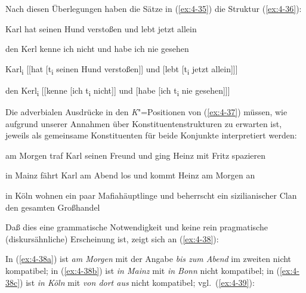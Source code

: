 \documentclass[output=paper]{langsci/langscibook}
\begin{document}
Nach diesen Überlegungen haben die Sätze in (\ref{ex:4-35}) die Struktur (\ref{ex:4-36}):

\begin{exe}
\ex
\label{ex:4-35}
\begin{xlist}
\ex%
\label{ex:4-35a}
Karl hat seinen Hund verstoßen und lebt jetzt allein

\ex%
\label{ex:4-35b}
den Kerl kenne ich nicht und habe ich nie gesehen
\end{xlist}
\ex
\label{ex:4-36}
\begin{xlist}
\ex%
\label{ex:4-36a}
Karl\textsubscript{i} [[hat [t\textsubscript{i} seinen Hund verstoßen]] und [lebt [t\textsubscript{i} jetzt allein]]]

\ex%
\label{ex:4-36b}
den Kerl\textsubscript{i} [[kenne [ich t\textsubscript{i} nicht]] und [habe [ich t\textsubscript{i} nie gesehen]]]
\end{xlist}
\end{exe}
Die adverbialen Ausdrücke in den \textit{K}{}"=Positionen von (\ref{ex:4-37}) müssen, wie aufgrund unserer Annahmen über Konstituentenstrukturen zu erwarten ist, jeweils als gemeinsame Konstituenten für beide Konjunkte interpretiert werden:

\begin{exe}
\ex
\label{ex:4-37}
\begin{xlist}
\ex%
\label{ex:4-37a}
am Morgen traf Karl seinen Freund und ging Heinz mit Fritz spazieren

\ex%
\label{ex:4-37b}
in Mainz fährt Karl am Abend los und kommt Heinz am Morgen an

\ex%
\label{ex:4-37c}
in Köln wohnen ein paar Mafiahäuptlinge und beherrscht ein sizilianischer Clan den gesamten Großhandel
\end{xlist}
\end{exe}
Daß dies eine grammatische Notwendigkeit und keine rein pragmatische (diskurs{\-}ähnliche) Erscheinung ist, zeigt sich an (\ref{ex:4-38}):

\begin{exe}
\ex
\label{ex:4-38}
\begin{xlist}



\end{xlist}
\end{exe}
In (\ref{ex:4-38a}) ist \textit{am Morgen} mit der Angabe \textit{bis zum Abend} im zweiten  nicht kompatibel; in (\ref{ex:4-38b}) ist \textit{in Mainz} mit \textit{in Bonn} nicht kompatibel; in (\ref{ex:4-38c}) ist \textit{in Köln} mit \textit{von dort aus} nicht kompatibel; vgl.\ (\ref{ex:4-39}):
\end{document}
